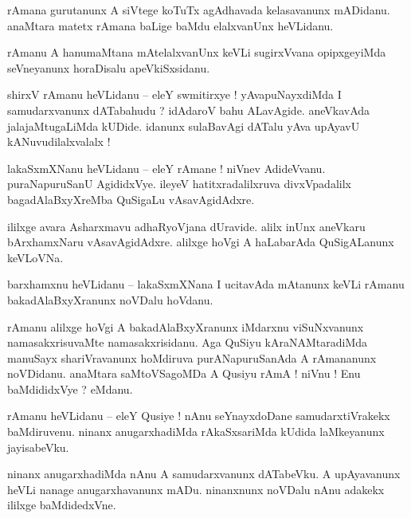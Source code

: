 \documentclass{article}
\begin{document}
\begin{mn}%
rAmana gurutanunx A siVtege koTuTx agAdhavada kelasavanunx mADidanu. anaMtara matetx rAmana baLige 
baMdu elalxvanUnx heVLidanu.
\end{mn}

\begin{mn}%
rAmanu A hanumaMtana mAtelalxvanUnx keVLi sugirxVvana opipxgeyiMda seVneyanunx horaDisalu 
apeVkiSxsidanu.
\end{mn}

\begin{mn}%
shirxV rAmanu heVLidanu -- eleY swmitirxye ! yAvapuNayxdiMda I samudarxvanunx dATabahudu ? idAdaroV 
bahu ALavAgide. aneVkavAda jalajaMtugaLiMda kUDide. idanunx sulaBavAgi dATalu yAva upAyavU 
kANuvudilalxvalalx !
\end{mn}

\begin{mn}%
lakaSxmXNanu heVLidanu -- eleY rAmane ! niVnev AdideVvanu. puraNapuruSanU AgididxVye. ileyeV 
hatitxradalilxruva divxVpadalilx bagadAlaBxyXreMba QuSigaLu vAsavAgidAdxre.
\end{mn}

\begin{mn}%
ililxge avara Asharxmavu adhaRyoVjana dUravide. alilx inUnx aneVkaru bArxhamxNaru vAsavAgidAdxre. 
alilxge hoVgi A haLabarAda QuSigALanunx keVLoVNa.
\end{mn}

\begin{mn}%
barxhamxnu heVLidanu -- lakaSxmXNana I ucitavAda mAtanunx keVLi rAmanu bakadAlaBxyXranunx noVDalu 
hoVdanu.
\end{mn}

\begin{mn}%
rAmanu alilxge hoVgi A bakadAlaBxyXranunx iMdarxnu viSuNxvanunx namasakxrisuvaMte namasakxrisidanu. 
Aga QuSiyu kAraNAMtaradiMda manuSayx shariVravanunx hoMdiruva purANapuruSanAda A rAmananunx 
noVDidanu. anaMtara saMtoVSagoMDa A Qusiyu rAmA ! niVnu ! Enu baMdididxVye ? eMdanu.
\end{mn}

\begin{mn}%
rAmanu heVLidanu -- eleY Qusiye ! nAnu seYnayxdoDane samudarxtiVrakekx baMdiruvenu. ninanx 
anugarxhadiMda rAkaSxsariMda kUdida laMkeyanunx jayisabeVku.
\end{mn}

\begin{mn}%
ninanx anugarxhadiMda nAnu A samudarxvanunx dATabeVku. A upAyavanunx heVLi nanage anugarxhavanunx 
mADu. ninanxnunx noVDalu nAnu adakekx ililxge baMdidedxVne.
\end{mn}
\end{document}
